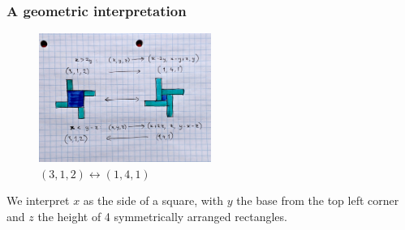 \documentclass{beamer}
\begin{document}
\begin{frame}
	\frametitle{A geometric interpretation}
	\begin{figure}
	\begin{center}
             \includegraphics[width=0.5\textwidth]{windmill_example_levels.jpg}
        \end{center}
		\caption*{ $(3,1,2) \leftrightarrow (1,4,1)$}
                \label{fig:windmill1}
	\end{figure}

	We interpret $x$ as the side of a square, with $y$ the base from the top left corner and
	$z$ the height of 4 symmetrically arranged rectangles.
\end{frame}
\end{document}

